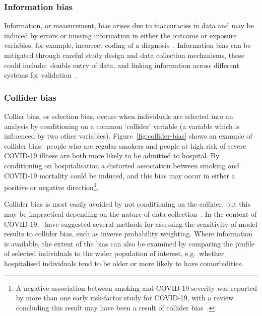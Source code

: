 \subsubsection{Information bias}

Information, or measurement, bias arises due to inaccuracies in data and may be induced by errors or missing information in either the outcome or exposure variables, for example, incorrect coding of a diagnosis~\parencite{Hernan2023-de}. Information bias can be mitigated through careful study design and data collection mechanisms, these could include:\ double entry of data, and linking information across different systems for validation~\parencite{Page2008-on}.

\subsubsection{Collider bias}

Collier bias, or selection bias, occurs when individuals are selected into an analysis by conditioning on a common `collider' variable (a variable which is influenced by two other variables). Figure~\ref{fig:collider-bias} shows an example of collider bias:\ people who are regular smokers and people at high risk of severe COVID-19 illness are both more likely to be admitted to hospital. By conditioning on hospitalisation a distorted association between smoking and COVID-19 mortality could be induced, and this bias may occur in either a positive or negative direction\footnote{A negative association between smoking and COVID-19 severity was reported by more than one early risk-factor study for COVID-19, with a review concluding this result may have been a result of collider bias~\parencite{Wenzl2020-fo}.}.

Collider bias is most easily avoided by not conditioning on the collider, but this may be impractical depending on the nature of data collection~\parencite{Holmberg2022-hb}. In the context of COVID-19,~\cite{Griffith2020-il} have suggested several methods for assessing the sensitivity of model results to collider bias, such as inverse probability weighting. Where information is available, the extent of the bias can also be examined by comparing the profile of selected individuals to the wider population of interest, e.g.\ whether hospitalised individuals tend to be older or more likely to have comorbidities.

